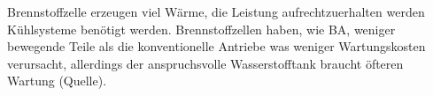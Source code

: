 
Brennstoffzelle erzeugen viel Wärme, die Leistung aufrechtzuerhalten werden Kühlsysteme benötigt werden.
Brennstoffzellen haben, wie BA, weniger bewegende Teile als die konventionelle Antriebe \cite{dalmia2022powering} was weniger Wartungskosten verursacht,
allerdings der anspruchsvolle Wasserstofftank braucht öfteren Wartung (Quelle).

